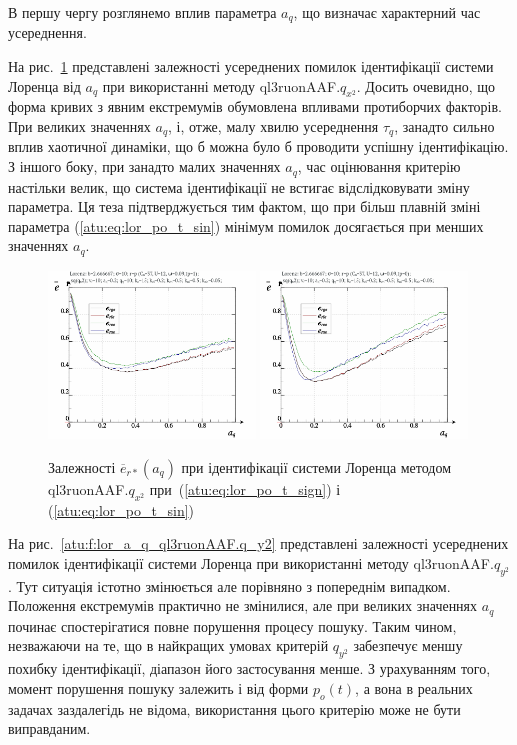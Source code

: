 В першу чергу розглянемо вплив параметра
$a_q$, що визначає характерний час усереднення.

На рис.~\ref{atu:f:lor_a_q_ql3ruonAAF.q_x2} представлені залежності усереднених
помилок ідентифікації системи Лоренца від
$ a_q $ при використанні методу
ql3ruonAAF.$q_{x^2}$.
Досить очевидно, що форма кривих з явним екстремумів обумовлена
впливами протиборчих факторів. При великих значеннях
$a_q$, і, отже, малу хвилю усереднення
$ \tau_q $, занадто сильно вплив хаотичної динаміки, що б можна було
б проводити успішну ідентифікацію. З іншого боку, при занадто
малих значеннях
$a_q$, час оцінювання критерію настільки велик, що система
ідентифікації не встигає відслідковувати зміну параметра. Ця
теза підтверджується тим фактом, що при більш плавній зміні
параметра (\ref{atu:eq:lor_po_t_sin}) мінімум помилок досягається при
менших значеннях
$a_q$.

\begin{figure}[ht!]
  \centerline{
    \includegraphics[width=0.49\textwidth]{p/cha/lor/ql3ruonAAF/lor_ql3ruonAAF_qx2-p_a_q_e_sign.png}
    \hfill
    \includegraphics[width=0.49\textwidth]{p/cha/lor/ql3ruonAAF/lor_ql3ruonAAF_qx2-p_a_q_e_sin.png}
  }
  \caption{Залежності $ \overline{e}_{r *} (a_q) $ при ідентифікації системи Лоренца методом ql3ruonAAF.$q_{x^2} $ при~(\ref{atu:eq:lor_po_t_sign}) і (\ref{atu:eq:lor_po_t_sin})}
  \label{atu:f:lor_a_q_ql3ruonAAF.q_x2}
\end{figure}


На рис.~\ref{atu:f:lor_a_q_ql3ruonAAF.q_y2} представлені залежності усереднених
помилок ідентифікації системи Лоренца при використанні методу
ql3ruonAAF.$q_{y^2} $. Тут ситуація істотно змінюється але порівняно з
попереднім випадком. Положення екстремумів практично не
змінилися, але при великих значеннях
$ a_q $ починає спостерігатися повне порушення процесу
пошуку. Таким чином, незважаючи на те, що в найкращих умовах
критерій
$ q_{y^2} $ забезпечує меншу похибку ідентифікації, діапазон його
застосування менше. З урахуванням того, момент порушення пошуку
залежить і від форми
$ p_o (t) $, а вона в реальних задачах заздалегідь не відома,
використання цього критерію може не бути виправданим.

